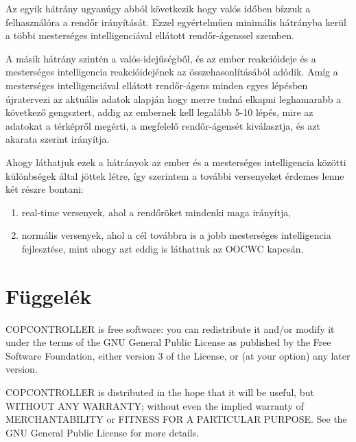 \documentclass[a4paper,12pt]{report}
\begin{document}
\vspace{2mm}
Az egyik hátrány ugyanúgy abból következik hogy valós időben bízzuk a felhasználóra a rendőr irányítását. Ezzel egyértelműen minimális hátrányba kerül a többi mesterséges intelligenciával ellátott rendőr-ágenssel szemben.

\vspace{2mm}
A másik hátrány szintén a valós-idejűségből, és az ember reakcióideje és a mesterséges intelligencia reakcióidejének az összehasonlításából adódik. Amíg a mesterséges intelligenciával ellátott rendőr-ágens minden egyes lépésben újratervezi az aktuális adatok alapján hogy merre tudná elkapni leghamarabb a következő gengsztert, addig az embernek kell legalább 5-10 lépés, mire az adatokat a térképről megérti, a megfelelő rendőr-ágensét kiválasztja, és azt akarata szerint irányítja.

\vspace{2mm}
Ahogy láthatjuk ezek a hátrányok az ember és a mesterséges intelligencia közötti különbségek által jöttek létre, így szerintem a további versenyeket érdemes lenne két részre bontani: 
\begin{enumerate} 
\item real-time versenyek, ahol a rendőröket mindenki maga irányítja, 
\item normális versenyek, ahol a cél továbbra is a jobb mesterséges intelligencia fejlesztése, mint ahogy azt eddig is láthattuk az OOCWC kapcsán.
\end{enumerate}

\newpage
{}

\begin{singlespace}

\end{singlespace}

\chapter*{Függelék}

\noindent
COPCONTROLLER is free software: you can redistribute it and/or modify
it under the terms of the GNU General Public License as published by
the Free Software Foundation, either version 3 of the License, or
(at your option) any later version.

\noindent
COPCONTROLLER is distributed in the hope that it will be useful,
but WITHOUT ANY WARRANTY; without even the implied warranty of
MERCHANTABILITY or FITNESS FOR A PARTICULAR PURPOSE.  See the
GNU General Public License for more details.
\end{document}
